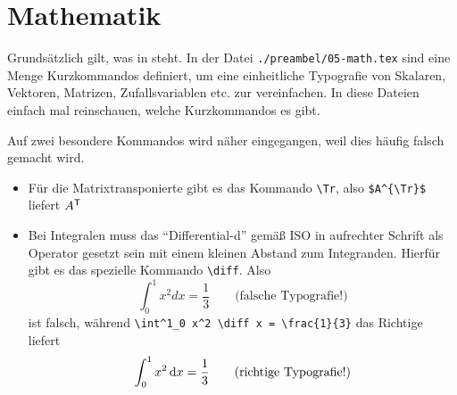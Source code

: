 \section{Mathematik}%
\label{sec:Mathe}
%
Grundsätzlich gilt, was in \parencites{ams1999a}{ams1999b} steht. In der Datei
\texttt{./preambel/05-math.tex} sind eine Menge Kurzkommandos definiert, um eine
einheitliche Typografie von Skalaren, Vektoren,
Matrizen, Zufallsvariablen etc.
zur vereinfachen. In diese Dateien einfach mal reinschauen, welche Kurzkommandos
es gibt.

Auf zwei besondere Kommandos wird näher eingegangen, weil dies häufig falsch
gemacht wird.
\begin{itemize}
  \item Für die Matrixtransponierte gibt es das Kommando \verb#\Tr#, also
	\verb#$A^{\Tr}$# liefert $A^{\mathsf{T}}$
	
	\item Bei Integralen muss das \enquote{Differential-d} gemäß
	ISO in aufrechter Schrift als Operator gesetzt sein mit einem kleinen Abstand
	zum Integranden. Hierfür gibt es das spezielle Kommando \verb#\diff#. Also
	\begin{equation}
	 \int^1_0 x^2 d x = \frac{1}{3} \qquad \text{(falsche Typografie!)}
	\end{equation}
	ist falsch, während \verb#\int^1_0 x^2 \diff x = \frac{1}{3}# das Richtige
	liefert
	\begin{equation}
	 \int^1_0 x^2 \mathop{}\!\mathrm{d} x = \frac{1}{3} \qquad \text{(richtige Typografie!)}
	\end{equation}
\end{itemize}

